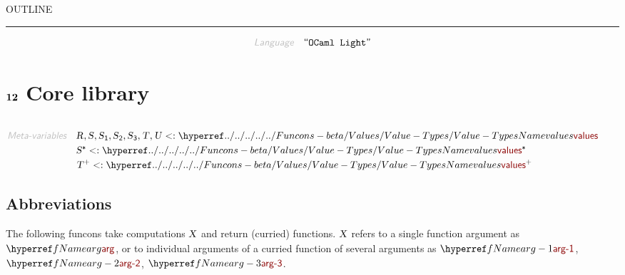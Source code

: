 


    OUTLINE
  \tableofcontents
\begin{center}
\rule{3in}{0.4pt}
\end{center}

\begin{displaymath}
\KEY{Language} \quad \STRING{OCaml Light}
\end{displaymath}

\section{$\SECT{12}$ Core library}\hypertarget{SectionNumber:12}{}\label{SectionNumber:12}

\begin{align*}
  [ \
  \KEY{Funcon} \quad & \NAMEREF{ocaml-light-core-library} \\
  \KEY{Funcon} \quad & \NAMEREF{ocaml-light-match-failure} \\
  \KEY{Funcon} \quad & \NAMEREF{ocaml-light-is-structurally-equal} \\
  \KEY{Funcon} \quad & \NAMEREF{ocaml-light-to-string} \\
  \KEY{Funcon} \quad & \NAMEREF{ocaml-light-define-and-display} \\
  \KEY{Funcon} \quad & \NAMEREF{ocaml-light-evaluate-and-display}
  \ ]
\end{align*}
\begin{align*}
  \KEY{Meta-variables} \quad
  & \VAR{R}, \VAR{S}, \VAR{S}\SUB{1}, \VAR{S}\SUB{2}, \VAR{S}\SUB{3}, \VAR{T}, \VAR{U} <: \NAMEHYPER{../../../../../Funcons-beta/Values}{Value-Types}{values} \qquad \\& \VAR{S}\STAR <: \NAMEHYPER{../../../../../Funcons-beta/Values}{Value-Types}{values}\STAR \qquad \\& \VAR{T}\PLUS <: \NAMEHYPER{../../../../../Funcons-beta/Values}{Value-Types}{values}\PLUS
\end{align*}
\subsection{Abbreviations}\hypertarget{abbreviations}{}\label{abbreviations}

The following funcons take computations $\SHADE{\VAR{X}}$ and return (curried) functions.
  $\SHADE{\VAR{X}}$ refers to a single function argument as $\SHADE{\NAMEREF{arg}}$, or to individual arguments
  of a curried function of several arguments as $\SHADE{\NAMEREF{arg-1}}$, $\SHADE{\NAMEREF{arg-2}}$, $\SHADE{\NAMEREF{arg-3}}$.


